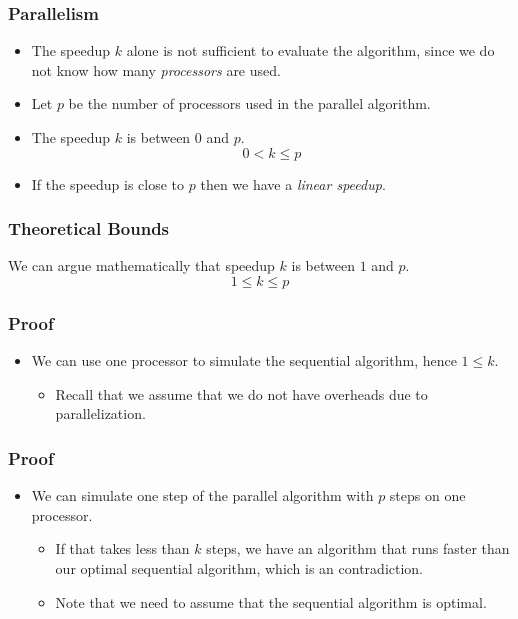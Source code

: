\documentclass{beamer}
\begin{document}
\begin{CJK}{UTF8}{bsmi}
\begin{frame}
\frametitle{Parallelism}
\begin{itemize}
\item The speedup $k$ alone is not sufficient to evaluate the
  algorithm, since we do not know how many {\em processors} are used.
\item Let $p$ be the number of processors used in the parallel
  algorithm.
\item The speedup $k$ is between $0$ and $p$.
\begin{equation}
0 < k \leq p
\end{equation}
\item If the speedup is close to $p$ then we have a {\em linear
  speedup}.
\end{itemize}
\end{frame}

\begin{frame}
\frametitle{Theoretical Bounds} We can argue mathematically that
speedup $k$ is between $1$ and $p$.
\begin{equation}
1 \leq k \leq p
\end{equation}
\end{frame}


\begin{frame}
\frametitle{Proof}
\begin{itemize}
\item We can use one processor to simulate the sequential algorithm,
  hence $1 \leq k$.
  \begin{itemize}
  \item Recall that we assume that we do not have overheads due to
    parallelization.
  \end{itemize}
\end{itemize}
\end{frame}

\begin{frame}
\frametitle{Proof}
\begin{itemize}
\item We can simulate one step of the parallel algorithm with $p$
  steps on one processor.
\begin{itemize}
  \item If that takes less than $k$ steps, we have an algorithm that
    runs faster than our optimal sequential algorithm, which is an
    contradiction.
  \item Note that we need to assume that the sequential algorithm is
    optimal.
\end{itemize}
\end{itemize}
\end{frame}



\end{CJK}
\end{document}
